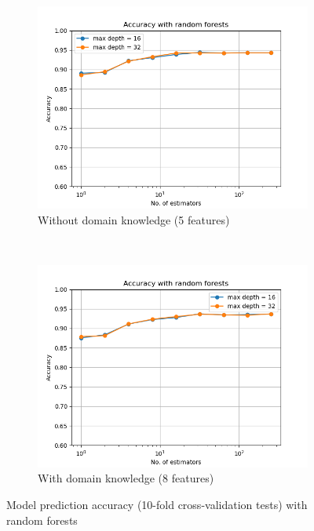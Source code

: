 \documentclass{article}
\begin{document}
\begin{figure}[h!]
    \centering
    \begin{subfigure}[b]{0.45\textwidth}
        \includegraphics[width=\textwidth]{figures/wo_domain_knowledge/accuracy_rand_forests.png}
        \caption{Without domain knowledge (5  features)}
        \label{fig:rf_wo}
    \end{subfigure}
    ~ %
    \begin{subfigure}[b]{0.45\textwidth}
        \includegraphics[width=\textwidth]{figures/w_domain_knowledge/accuracy_rand_forests.png}
        \caption{With domain knowledge (8  features)}
        \label{fig:rf_w}
    \end{subfigure}
    \caption{Model prediction accuracy (10-fold cross-validation tests) with random forests}\label{fig:rf}
\end{figure}
\end{document}
